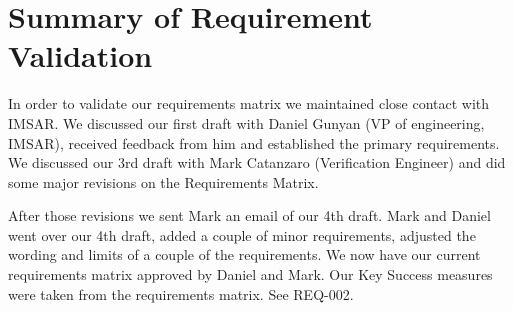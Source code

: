 \chapter{Summary of Requirement Validation}

In order to validate our requirements matrix we maintained close contact with IMSAR. We discussed our first draft with Daniel Gunyan (VP of engineering, IMSAR), received feedback from him and established the primary requirements.
We discussed our 3rd draft with Mark Catanzaro (Verification Engineer) and did some major revisions on the Requirements Matrix.

After those revisions we sent Mark an email of our 4th draft. Mark and Daniel went over our 4th draft, added a couple of minor requirements, adjusted the wording and limits of a couple of the requirements. We now have our current requirements matrix approved by Daniel and Mark. Our Key Success measures were taken from the requirements matrix. See REQ-002.
